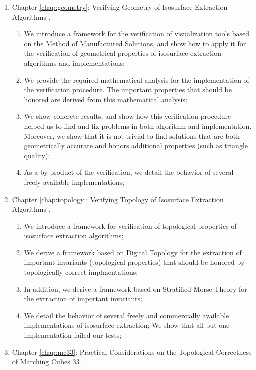 \begin{enumerate}[topsep=0px,partopsep=0px,itemsep=0px,parsep=0px]
\item Chapter \ref{chap:geometry}: Verifying Geometry of Isosurface Extraction Algorithms \cite{etiene:tvcg:2009}.
\begin{enumerate}[topsep=0px,partopsep=0px,itemsep=0px,parsep=0px]
\item We introduce a framework for the verification of visualization tools based on the Method of Manufactured Solutions, and show how to apply it for the verification of geometrical properties of isosurface extraction algorithms and implementations;
\item We provide the required mathematical analysis for the implementation of the verification procedure. The important properties that should be honored are derived from this mathematical analysis;
\item We show concrete results, and show how this verification procedure helped us to find and fix problems in both algorithm and implementation. Moreover, we show that it is not trivial to find solutions that are both geometrically accurate and honors additional properties (such as triangle quality);
\item As a by-product of the verification, we detail the behavior of several freely available implementations;
\end{enumerate}
\item Chapter \ref{chap:topology}: Verifying Topology of Isosurface Extraction Algorithms \cite{Etiene:2012:TVI:2197070.2197097}.
\begin{enumerate}[topsep=0px,partopsep=0px,itemsep=0px,parsep=0px]
\item We introduce a framework for verification of topological properties of isosurface extraction algorithms;
\item We derive a framework based on Digital Topology for the extraction of important invariants (topological properties) that should be honored by topologically correct implmentations;
\item In addition, we derive a framework based on Stratified Morse Theory for the extraction of important invariants;
\item We detail the behavior of several freely and commercially available implementations of isosurface extraction; We show that all but one implementation failed our tests;
\end{enumerate}
\item Chapter \ref{chap:mc33}: Practical Considerations on the Topological Correctness of Marching Cubes 33 \cite{Lis2013}.

\end{enumerate}
